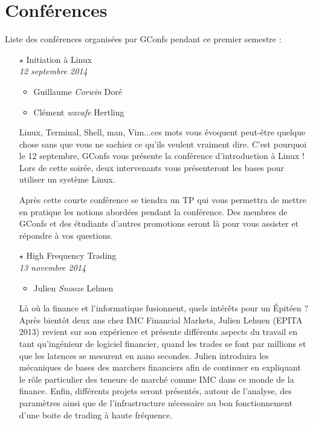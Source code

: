 \documentclass[a4paper]{article}
\title{\mytitle}
\author{toogy}
\begin{document}
\maketitle

\section{Conférences}

Liste des conférences organisées par GConfs pendant ce premier semestre :\\

\begin{itemize}
    \item[$\star$] Initiation à Linux\\
        \emph{12 septembre 2014}
        \begin{itemize}
            \item Guillaume \emph{Corwin} Doré
            \item Clément \emph{wxcafe} Hertling
        \end{itemize}
        Linux, Terminal, Shell, man, Vim...ces mots vous évoquent peut-être
        quelque chose sans que vous ne sachiez ce qu'ils veulent vraiment
        dire.
        C'est pourquoi le 12 septembre, GConfs vous présente la conférence
        d'introduction à Linux !
        Lors de cette soirée, deux intervenants vous présenteront les bases
        pour utiliser un système Linux.
        
        Après cette courte conférence se tiendra un TP qui vous permettra de
        mettre en pratique les notions abordées pendant la conférence.
        Des membres de GConfs et des étudiants d'autres promotions seront là
        pour vous assister et répondre à vos questions.
        \vspace{0.3cm}

    \item[$\star$] High Frequency Trading\\
        \emph{13 novembre 2014}
        \begin{itemize}
            \item Julien \emph{Snooze} Lehuen
        \end{itemize}

        Là où la finance et l'informatique fusionnent, quels intérêts pour un
        Épitéen ? Après bientôt deux ans chez IMC Financial Markets, Julien
        Lehuen (EPITA 2013) revient sur son expérience et présente différents
        aspects du travail en tant qu'ingénieur de logiciel financier, quand
        les trades se font par millions et que les latences se mesurent en nano
        secondes. Julien introduira les mécaniques de bases des marchers
        financiers afin de continuer en expliquant le rôle particulier des
        teneurs de marché comme IMC dans ce monde de la finance. Enfin,
        différents projets seront présentés, autour de l'analyse, des
        paramètres ainsi que de l'infrastructure nécessaire au bon
        fonctionnement d'une boite de trading à haute fréquence.


\end{itemize}
\end{document}
